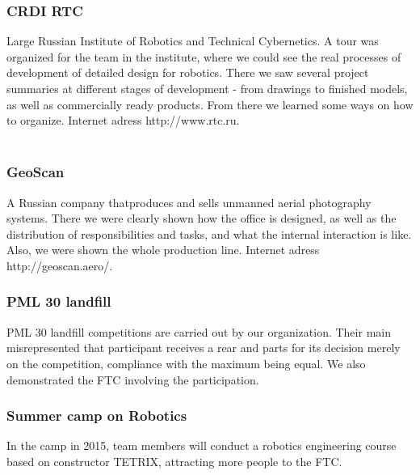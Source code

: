	\subsubsection{CRDI RTC}
		Large Russian Institute of Robotics and Technical Cybernetics. A tour was organized for the team in the institute, where we could see the real processes of development of detailed design for robotics. There we saw several project summaries at different stages of development - from drawings to finished models, as well as commercially ready products. From there we learned some ways on how to organize. Internet adress http://www.rtc.ru.	\\
		\\
	\subsubsection{GeoScan}
		A Russian company thatproduces and sells unmanned aerial photography systems. There we were clearly shown how the office is designed, as well as the distribution of responsibilities and tasks, and what the internal interaction is like. Also, we were shown the whole production line. Internet adress http://geoscan.aero/.	
		\\
	\subsubsection{PML 30 landfill}	
		PML 30 landfill competitions are carried out by our organization. Their main  misrepresented that participant receives a rear and parts for its decision merely on the competition, compliance with the maximum being equal. We also demonstrated the FTC involving the participation.
		\\
	\subsubsection{Summer camp on Robotics}
	In the camp in 2015, team members will conduct a robotics engineering course based on constructor TETRIX, attracting more people to the FTC.
		
		
		
		
		
		
		
		
		
